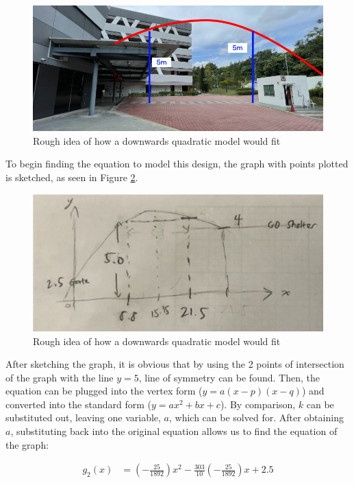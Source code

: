 \documentclass[a4paper,titlepage]{article}
\begin{document}
\begin{figure}[htbp]
    \centering
    \includegraphics[width=\textwidth]{downwardsConcaveRoughIdea.png}
    \caption{Rough idea of how a downwards quadratic model would fit}
    \label{fig:downwardsConcaveRoughIdea}
\end{figure}

To begin finding the equation to model this design, the graph with points plotted is sketched, as seen in Figure \ref{fig:downwardsConcaveSketch}.

\begin{figure}[htbp]
    \centering
    \includegraphics[width=\textwidth]{downwardsConcaveSketch.png}
    \caption{Rough idea of how a downwards quadratic model would fit}
    \label{fig:downwardsConcaveSketch}
\end{figure}

After sketching the graph, it is obvious that by using the 2 points of intersection of the graph with the line $y = 5$, line of symmetry can be found. Then, the equation can be plugged into the vertex form ($y=a(x-p)(x-q)$) and converted into the standard form ($y=ax^2+bx+c$). By comparison, $k$ can be substituted out, leaving one variable, $a$, which can be solved for. After obtaining $a$, substituting back into the original equation allows us to find the equation of the graph:

\begin{align}
    g_2(x)&=\left(-\frac{25}{1892}\right)x^{2}-\frac{303}{10}\left(-\frac{25}{1892}\right)x+2.5
\end{align}
\end{document}
